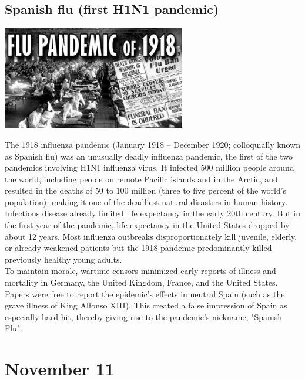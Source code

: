 \documentclass[11pt]{report}
\begin{document}
\subsection{Spanish flu (first H1N1 pandemic)}
\vspace{2mm}\begin{center}\includegraphics[width=8cm]{./img/spanishFlu.jpg}\end{center}
The 1918 influenza pandemic (January 1918 – December 1920; colloquially known as Spanish flu) was an unusually deadly influenza pandemic, the first of the two pandemics involving H1N1 influenza virus. It infected 500 million people around the world, including people on remote Pacific islands and in the Arctic, and resulted in the deaths of 50 to 100 million (three to five percent of the world's population), making it one of the deadliest natural disasters in human history.\\
Infectious disease already limited life expectancy in the early 20th century. But in the first year of the pandemic, life expectancy in the United States dropped by about 12 years. Most influenza outbreaks disproportionately kill juvenile, elderly, or already weakened patients but the 1918 pandemic predominantly killed previously healthy young adults.\\
To maintain morale, wartime censors minimized early reports of illness and mortality in Germany, the United Kingdom, France, and the United States. Papers were free to report the epidemic's effects in neutral Spain (such as the grave illness of King Alfonso XIII). This created a false impression of Spain as especially hard hit, thereby giving rise to the pandemic's nickname, "Spanish Flu".
\section{November 11}
\end{document}
